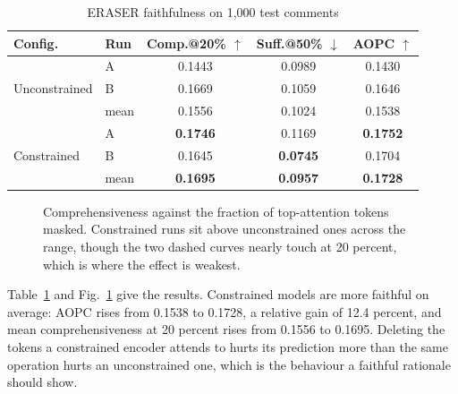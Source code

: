 \documentclass[conference]{IEEEtran}
\begin{document}
\begin{table}[t]
\caption{ERASER faithfulness on 1{,}000 test comments}
\label{tab:eraser}
\centering
\footnotesize
\begin{tabular}{llccc}
\toprule
\textbf{Config.} & \textbf{Run} & \textbf{Comp.@20\%} $\uparrow$ & \textbf{Suff.@50\%} $\downarrow$ & \textbf{AOPC} $\uparrow$ \\
\midrule
\multirow{3}{*}{Unconstrained}
 & A & 0.1443 & 0.0989 & 0.1430 \\
 & B & 0.1669 & 0.1059 & 0.1646 \\
 & mean & 0.1556 & 0.1024 & 0.1538 \\
\midrule
\multirow{3}{*}{Constrained}
 & A & \textbf{0.1746} & 0.1169 & \textbf{0.1752} \\
 & B & 0.1645 & \textbf{0.0745} & 0.1704 \\
 & mean & \textbf{0.1695} & \textbf{0.0957} & \textbf{0.1728} \\
\bottomrule
\end{tabular}
\end{table}

\begin{figure}[t]
\centering
{}
\caption{Comprehensiveness against the fraction of top-attention tokens
masked. Constrained runs sit above unconstrained ones across the range,
though the two dashed curves nearly touch at 20 percent, which is where the
effect is weakest.}
\label{fig:perturb}
\end{figure}

Table~\ref{tab:eraser} and Fig.~\ref{fig:perturb} give the results. Constrained models are more faithful on average: AOPC rises from 0.1538 to 0.1728, a relative gain of 12.4 percent, and mean comprehensiveness at 20 percent rises from 0.1556 to 0.1695. Deleting the tokens a constrained encoder attends to hurts its prediction more than the same operation hurts an unconstrained one, which is the behaviour a faithful rationale should show.
\end{document}
